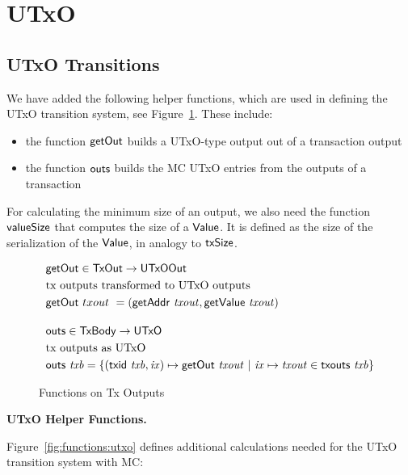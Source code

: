 \section{UTxO}
\label{sec:utxo}


\subsection{UTxO Transitions}
\label{sec:utxo-trans}

We have added the following helper functions, which are used in defining the
UTxO transition system, see Figure~\ref{fig:functions:insouts}. These include:

\begin{itemize}
  \item the function $\mathsf{getOut}$ builds a UTxO-type output out of a
  transaction output
  \item the function $\mathsf{outs}$ builds the MC UTxO entries from the outputs
  of a transaction
\end{itemize}

For calculating the minimum size of an output, we also need the
function $\mathsf{valueSize}$ that computes the size of a $\mathsf{Value}$. It is
defined as the size of the serialization of the $\mathsf{Value}$, in analogy
to $\mathsf{txSize}$.

\begin{figure}[htb]
  \begin{align*}
    & \fun{getOut} \in \TxOut \to \UTxOOut \\
    & \text{tx outputs transformed to UTxO outputs} \\
    & \fun{getOut} ~{txout}~= (\fun{getAddr}~\var{txout}, \fun{getValue}~\var{txout})
    \nextdef
    & \fun{outs} \in \TxBody \to \UTxO \\
    & \text{tx outputs as UTxO} \\
    & \fun{outs} ~\var{txb} =
        \left\{
          (\fun{txid} ~ \var{txb}, \var{ix}) \mapsto \fun{getOut}~\var{txout} ~
          \middle|~
          \var{ix} \mapsto \var{txout} \in \txouts{txb}
        \right\} \\
  \end{align*}
  \caption{Functions on Tx Outputs}
  \label{fig:functions:insouts}
\end{figure}

\textbf{UTxO Helper Functions.}

Figure~\ref{fig:functions:utxo} defines additional calculations needed for the
UTxO transition system with MC:

